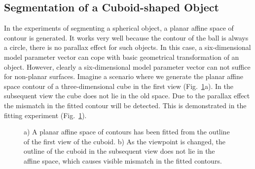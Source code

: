 \subsection{Segmentation of a Cuboid-shaped Object}
\label{sec:s3o}
In the experiments of segmenting a spherical object, a planar
affine space of contour is generated. It works very well because the
contour of the ball is always a circle, there is no parallax effect
for such objects. In this case, a six-dimensional model parameter vector
can cope with basic geometrical transformation of an object. However,
clearly a six-dimensional model parameter vector can not
suffice for non-planar surfaces. Imagine a scenario where we generate the  planar affine
space contour of a three-dimensional cube in the first view (Fig.~\ref{fig:box_mismatch}a). In the
subsequent view the cube does not lie in the old
space. Due to the parallax effect the mismatch in the fitted contour
will be detected. This is demonstrated in the fitting experiment (Fig.~\ref{fig:box_mismatch}).
\begin{figure}[htbp]
  \begin{minipage}[t]{0.5\linewidth} 
    \centering 
  \end{minipage}%
  \begin{minipage}[t]{0.5\linewidth} 
    \centering 
  \end{minipage} 
  \caption[Planar space can not encompass a general three-dimensional
  contour]{a) A planar affine space of contours has been fitted from
    the outline of the first view of the cuboid. b) As the viewpoint
    is changed, the outline of the cuboid in the subsequent view does
    not lie in the affine space, which causes visible mismatch in the
    fitted contours.}
\label{fig:box_mismatch}
\end{figure}


